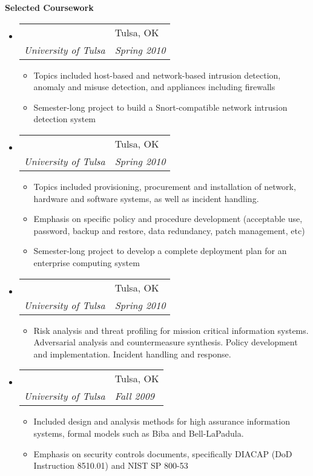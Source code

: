 \documentclass[letterpaper,11pt]{article}
\makeatletter
\newcommand{\resitem}[1]{\item \parbox[t]{4.6in}{#1} \vspace{-2pt}}
\newcommand{\resheading}[1]{{\large \colorbox{mygrey}{\begin{minipage}
    {\textwidth}{\textbf{#1 \vphantom{p\^{E}}}}\end{minipage}}}}
\newcommand{\ressubheading}[4]{
\begin{tabular*}{6.5in}[t]{l@{\extracolsep{\fill}}l}
		\textbf{\parbox[t]{4.5in}{\raggedright #1 }} & \parbox[b]{1.5in}{#2} \\
		\textit{#3} & \textit{#4} \\
\end{tabular*}\vspace{-6pt}}
\makeatother
\begin{document}
\resheading{Selected Coursework}
\begin{itemize}

\item
	\ressubheading{Network Security}{Tulsa, OK}{University of Tulsa}{Spring 2010}
	\begin{itemize}
		\resitem{Topics included host-based and network-based intrusion detection, anomaly and misuse detection, and appliances including firewalls}
		\resitem{Semester-long project to build a Snort-compatible network intrusion detection system}
	\end{itemize}
\item
	\ressubheading{Secure System Administration}{Tulsa, OK}{University of Tulsa}{Spring 2010}
	\begin{itemize}
		\resitem{Topics included provisioning, procurement and installation of network, hardware and software systems, as well as incident handling.}
		\resitem{Emphasis on specific policy and procedure development (acceptable use, password, backup and restore, data redundancy, patch management, etc)}
		\resitem{Semester-long project to develop a complete deployment plan for an enterprise computing system}
	\end{itemize}
\item
	\ressubheading{Risk Management for Information Systems}{Tulsa, OK}{University of Tulsa}{Spring 2010}
	\begin{itemize}
		\resitem{Risk analysis and threat profiling for mission critical information systems. Adversarial analysis and countermeasure synthesis. Policy development and implementation. Incident handling and response.}
	\end{itemize}
\item
	\ressubheading{Information Systems Assurance}{Tulsa, OK}{University of Tulsa}{Fall 2009}
	\begin{itemize}
		\resitem{Included design and analysis methods for high assurance information systems, formal models such as Biba and Bell-LaPadula.}
		\resitem{Emphasis on security controls documents, specifically DIACAP (DoD Instruction 8510.01) and NIST SP 800-53}

\end{itemize}
\end{itemize}
\end{document}
